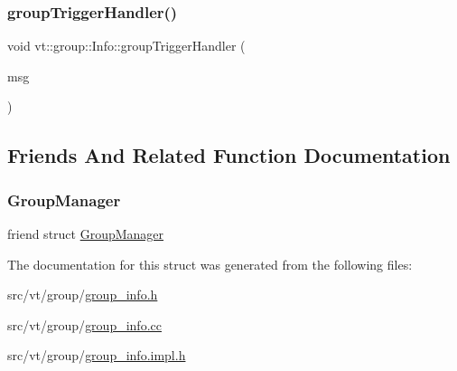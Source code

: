 \mbox{\label{structvt_1_1group_1_1_info_a4b457782f9b23a2ad6df129d6c4b1502}} 
\subsubsection{\texorpdfstring{group\+Trigger\+Handler()}{groupTriggerHandler()}}
{\footnotesize\ttfamily void vt\+::group\+::\+Info\+::group\+Trigger\+Handler (\begin{DoxyParamCaption}\item[{\hyperlink{namespacevt_1_1group_a864fcf6bc821eacf8350bf4ad15e51b3}{Group\+Only\+Msg} $\ast$}]{msg }\end{DoxyParamCaption})\hspace{0.3cm}{\ttfamily [static]}}



\subsection{Friends And Related Function Documentation}
\mbox{\label{structvt_1_1group_1_1_info_a698f77439e02c4d3309fed882290c09c}} 
\subsubsection{\texorpdfstring{Group\+Manager}{GroupManager}}
{\footnotesize\ttfamily friend struct \hyperlink{structvt_1_1group_1_1_group_manager}{Group\+Manager}\hspace{0.3cm}{\ttfamily [friend]}}



The documentation for this struct was generated from the following files\+:\begin{DoxyCompactItemize}
\item 
src/vt/group/\hyperlink{group__info_8h}{group\+\_\+info.\+h}\item 
src/vt/group/\hyperlink{group__info_8cc}{group\+\_\+info.\+cc}\item 
src/vt/group/\hyperlink{group__info_8impl_8h}{group\+\_\+info.\+impl.\+h}\end{DoxyCompactItemize}
